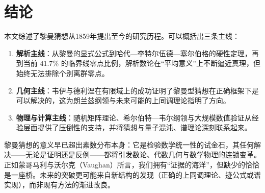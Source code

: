 \section{结论}\label{sec:conclusion}

本文综述了黎曼猜想从1859年提出至今的研究历程。可以概括出三条主线：

\begin{enumerate}[label=(\arabic*)]
    \item \textbf{解析主线}：从黎曼的显式公式到哈代—李特尔伍德—塞尔伯格的硬性定理，再到当前 $41.7\%$ 的临界线零点比例，解析数论在“平均意义”上不断逼近真理，但始终无法排除个别离群零点。
    \item \textbf{几何主线}：韦伊与德利涅在有限域上的成功证明了黎曼型猜想在正确框架下是可以解决的，这为朗兰兹纲领与未来可能的上同调理论指明了方向。
    \item \textbf{物理与计算主线}：随机矩阵理论、希尔伯特—韦尔纲领与大规模数值验证从经验层面提供了压倒性的支持，并将猜想与量子混沌、谱理论深刻联系起来。
\end{enumerate}

黎曼猜想的意义早已超出素数分布本身：它是检验数学统一性的试金石，其任何解决——无论是证明还是反例——都将引发数论、代数几何与数学物理的连锁变革。正如蒙哥马利与沃尔克（Vaughan）所言，我们拥有“证据的海洋”，但缺少的恰恰是一座桥。未来的突破更可能来自新结构的发现（正确的上同调理论、迹公式或谱实现），而非现有方法的渐进改良。
